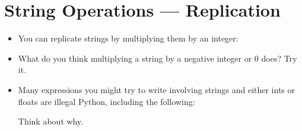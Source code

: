 \documentclass[letterpaper,10pt,english]{sphinxmanual}
\begin{document}
\section{String Operations — Replication}
\label{\detokenize{lecture_notes/lec03_strings:string-operations-replication}}\begin{itemize}
\item {} 
You can replicate strings by multiplying them by an integer:

\begin{sphinxVerbatim}[commandchars=\\\{\}]
  
  
\end{sphinxVerbatim}

\item {} 
What do you think multiplying a string by a negative integer or 0
does? Try it.

\item {} 
Many expressions you might try to write involving strings and either
ints or floats are illegal Python, including the following:

\begin{sphinxVerbatim}[commandchars=\\\{\}]
  
  
\end{sphinxVerbatim}

Think about why.

\end{itemize}
\end{document}

